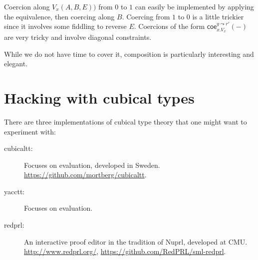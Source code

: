 \documentclass{article} \usepackage{chtt-notes} \usepackage{stmaryrd}
\newcommand{\coe}{\mathsf{coe}}
\begin{document}
Coercion along $V_x(A, B, E))$ from $0$ to $1$ can easily be implemented by applying the equivalence, then coercing along $B$.
Coercing from $1$ to $0$ is a little trickier since it involves some fiddling to reverse $E$.
Coercions of the form $\coe_{x.V_x}^{y \leadsto r'}(-)$ are very tricky and involve diagonal constraints.

While we do not have time to cover it, composition is particularly interesting and elegant.

\section{Hacking with cubical types}
There are three implementations of cubical type theory that one might want to experiment with:
\begin{description}
    \item[cubicaltt:] Focuses on evaluation, developed in Sweden. \url{https://github.com/mortberg/cubicaltt}.
    \item[yacctt:] Focuses on evaluation.
    \item[redprl:] An interactive proof editor in the tradition of Nuprl, developed at CMU. \url{http://www.redprl.org/}, \url{https://github.com/RedPRL/sml-redprl}.
\end{description}

 
\end{document}
